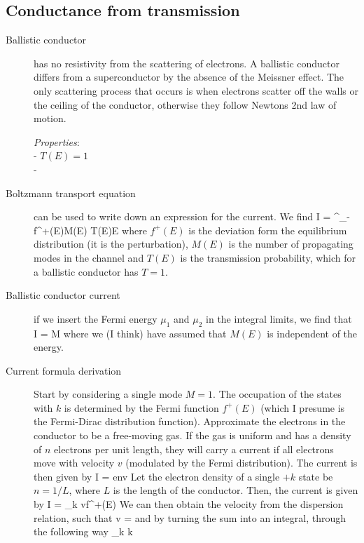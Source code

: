\subsection{Conductance from transmission}
\begin{description}
\item[Ballistic conductor] has no resistivity from the scattering of electrons. A ballistic conductor differs from a superconductor by the absence of the Meissner effect. The only scattering process that occurs is when electrons scatter off the walls or the ceiling of the conductor, otherwise they follow Newtons 2nd law of motion. 

\emph{Properties}: \\
- $T(E) = 1$ \\
- 

\item[Boltzmann transport equation] can be used to write down an expression for the current. We find
\beq
I =  \int^{\infty}_{- \infty} f^+(E)M(E) T(E)\intd E
\eeq
where $f^+(E)$ is the deviation form the equilibrium distribution (it is the perturbation), $M(E) $ is the number of propagating modes in the channel and $T(E)$ is the transmission probability, which for a ballistic conductor has $T = 1$. 

\item[Ballistic conductor current] if we insert the Fermi energy $\mu_1$ and $\mu_2$ in the integral limits, we find that
\beq
I =  M  
\eeq
where we (I think) have assumed that $M(E)$ is independent of the energy. 

\item[Current formula derivation] Start by considering a single mode $M = 1$. The occupation of the states with $k$ is determined by the Fermi function $f^+(E)$ (which I presume is the Fermi-Dirac distribution function). Approximate the electrons in the conductor to be a free-moving gas. If the gas is uniform and has a density of $n$ electrons per unit length, they will carry a current if all electrons move with velocity $v$ (modulated by the Fermi distribution). The current is then given by 
\beq
I = env
\eeq
Let the electron density of a single $+k$ state be $n = 1/L$, where $L$ is the length of the conductor. Then, the current is given by 
\beq
I =  \sum_k vf^+(E)
\eeq
We can then obtain the velocity from the dispersion relation, such that 
\beq
v = 
\eeq
and by turning the sum into an integral, through the following way
\beq
\sum_k   \int \intd k
\eeq


\end{description}
